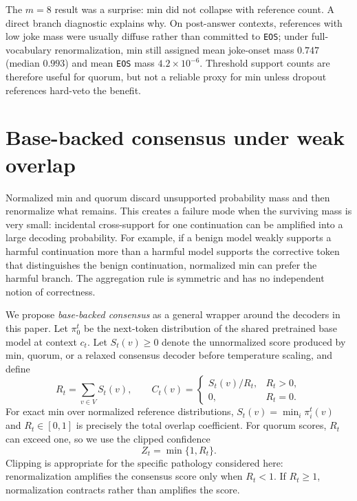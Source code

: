 \documentclass{article}
\begin{document}
The $m=8$ result was a surprise: min did not collapse with reference count. A
direct branch diagnostic explains why. On post-answer contexts, references
with low joke mass were usually diffuse rather than committed to
\texttt{EOS}; under full-vocabulary renormalization, min still assigned mean
joke-onset mass $0.747$ (median $0.993$) and mean \texttt{EOS} mass
$4.2\times 10^{-6}$. Threshold support counts are therefore useful for quorum,
but not a reliable proxy for min unless dropout references hard-veto the
benefit.

\clearpage
\section{Base-backed consensus under weak overlap}
\label{app:base-backed-consensus}

Normalized min and quorum discard unsupported probability mass and then
renormalize what remains. This creates a failure mode when the surviving mass
is very small: incidental cross-support for one continuation can be amplified
into a large decoding probability. For example, if a benign model weakly
supports a harmful continuation more than a harmful model supports the
corrective token that distinguishes the benign continuation, normalized min
can prefer the harmful branch. The aggregation rule is symmetric and has no
independent notion of correctness.

We propose \emph{base-backed consensus} as a general wrapper around the
decoders in this paper. Let $\pi_0^t$ be the next-token distribution of the
shared pretrained base model at context $c_t$. Let $S_t(v)\geq 0$ denote the
unnormalized score produced by min, quorum, or a relaxed consensus decoder
before temperature scaling, and define
\[
R_t=\sum_{v\in V}S_t(v),
\qquad
C_t(v)=
\begin{cases}
S_t(v)/R_t, & R_t>0,\\
0, & R_t=0.
\end{cases}
\]
For exact min over normalized reference distributions,
$S_t(v)=\min_i\pi_i^t(v)$ and $R_t\in[0,1]$ is precisely the total overlap
coefficient. For quorum scores, $R_t$ can exceed one, so we use the clipped
confidence
\[
Z_t=\min\{1,R_t\}.
\]
Clipping is appropriate for the specific pathology considered here:
renormalization amplifies the consensus score only when $R_t<1$. If
$R_t\geq1$, normalization contracts rather than amplifies the score.
\end{document}
